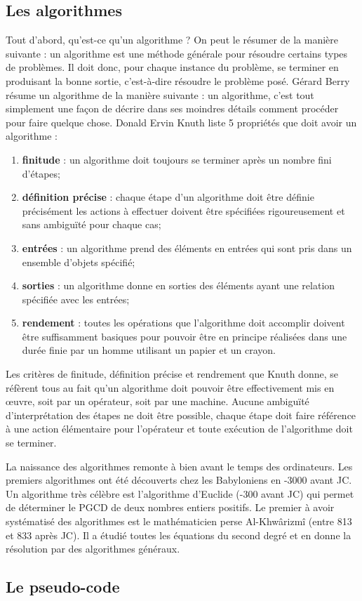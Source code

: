 
\subsection{Les algorithmes}
Tout d’abord, qu'est-ce qu'un algorithme ? On peut le résumer de la manière suivante :
un algorithme est une méthode générale pour résoudre certains types de problèmes. Il doit
donc, pour chaque instance du problème, se terminer en produisant la bonne sortie, c'est-à-dire résoudre le problème posé.
Gérard Berry résume un algorithme de la manière suivante : un algorithme, c’est tout simplement une façon de décrire dans ses moindres détails comment procéder pour faire quelque chose. 
Donald Ervin Knuth liste 5 propriétés que doit avoir un algorithme :
\begin{enumerate}
    \item \textbf{finitude} : un algorithme doit toujours se terminer après un nombre fini d’étapes;
    \item \textbf{définition précise} : chaque étape d’un algorithme doit être définie précisément les actions à effectuer doivent être spécifiées rigoureusement et sans ambiguïté pour chaque cas;
    \item \textbf{entrées} : un algorithme prend des éléments en entrées qui sont pris dans un ensemble d’objets spécifié;
    \item \textbf{sorties} : un algorithme donne en sorties des éléments ayant une relation spécifiée avec les entrées;
    \item \textbf{rendement} : toutes les opérations que l’algorithme doit accomplir doivent être suffisamment basiques pour pouvoir être en principe réalisées dans une durée finie par un homme utilisant un papier et un crayon.
\end{enumerate}

Les critères de finitude, définition précise et rendrement que Knuth donne, se réfèrent tous au fait qu'un algorithme doit pouvoir être effectivement mis en œuvre, soit par un opérateur, soit par une machine. Aucune ambiguïté d’interprétation des étapes ne doit être possible, chaque étape doit faire référence à une action élémentaire pour l’opérateur et toute exécution de l’algorithme doit se terminer.

La naissance des algorithmes remonte à bien avant le temps des ordinateurs. Les premiers algorithmes ont été découverts chez les Babyloniens en -3000 avant JC. Un algorithme très célèbre est l’algorithme d’Euclide (-300 avant JC) qui permet de déterminer le PGCD de deux nombres entiers positifs. Le premier à avoir systématisé des algorithmes est le mathématicien perse Al-Khwârizmî (entre 813 et 833 après JC). Il a étudié toutes les équations du second degré et en donne la résolution par des algorithmes généraux.

\subsection{Le pseudo-code}